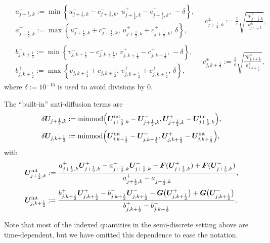 \documentclass[preprint,12pt]{elsarticle}
\newcommand{\kph}{{k+\frac{1}{2}}}
\newcommand{\jph}{{j+\frac{1}{2}}}
\newcommand{\ve}{\varepsilon}
\begin{document}
\begin{equation}
	\begin{aligned}
		\begin{aligned}
			&a^-_{\jph,k}:=\min\left\{u^-_{\jph,k}-c^-_{\jph,k},\,u^+_{\jph,k}-c^+_{\jph,k},\,-\delta\right\},\\
			&a^+_{\jph,k}:=\max\left\{u^-_{\jph,k}+c^-_{\jph,k},\,u^+_{\jph,k}+c^+_{\jph,k},\,\delta\right\},
		\end{aligned}\quad c^\pm_{\jph,k}:=\frac{1}{\ve}\sqrt{\frac{\gamma p^\pm_{\jph,k}}{\rho^\pm_{\jph,k}}},\\[1.5ex]
		\begin{aligned}
			&b^-_{j,\kph}:=\min\left\{v^-_{j,\kph}-c^-_{j,\kph},\,v^+_{j,\kph}-c^+_{j,\kph},\,-\delta\right\},\\
			&b^+_{j,\kph}:=\max\left\{v^-_{j,\kph}+c^-_{j,\kph},\,v^+_{j,\kph}+c^+_{j,\kph},\,\delta\right\},
		\end{aligned}\quad c^\pm_{j,\kph}:=\frac{1}{\ve}\sqrt{\frac{\gamma p^\pm_{j,\kph}}{\rho^\pm_{j,\kph}}},
	\end{aligned}
	\label{3.42}
\end{equation}
where $\delta:=10^{-15}$ is used to avoid divisions by $0$.

The ``built-in'' anti-diffusion terms are
\begin{equation}
	\begin{aligned}
		&\delta\bm U_{\jph,k}:={\rm minmod}\Big(\bm U_{\jph,k}^{\rm int}-\bm U^-_{\jph,k},\bm U^+_{\jph,k}-\bm U_{\jph,k}^{\rm int}\Big),\\[0.5ex]
		&\delta\bm U_{j,\kph}:={\rm minmod}\Big(\bm U_{j,\kph}^{\rm int}-\bm U^-_{j,\kph},\bm U^+_{j,\kph}-\bm U_{j,\kph}^{\rm int}\Big),
	\end{aligned}
	\label{3.43}
\end{equation}
with 
\begin{equation}
	\begin{aligned}
		&\bm U_{\jph,k}^{\rm int}:=\frac{a^+_{\jph,k}\bm U^+_{\jph,k}-a^-_{\jph,k}\bm U^-_{\jph,k}
			-\bm F(\bm U^+_{\jph,k})+\bm F(\bm U^-_{\jph,k})}{a^+_{\jph,k}-a^-_{\jph,k}},\\[0.5ex]
		&\bm U_{j,\kph}^{\rm int}:=\frac{b^+_{j,\kph}\bm U^+_{j,\kph}-b^-_{j,\kph}\bm U^-_{j,\kph}
			-\bm G\big(\bm U^+_{j,\kph}\big)+\bm G\big(\bm U^-_{j,\kph}\big)}{b^+_{j,\kph}-b^-_{j,\kph}}.
	\end{aligned}
	\label{3.44}
\end{equation}

Note that most of the indexed quantities in the semi-discrete setting above are time-dependent, but we have omitted this dependence to ease
the notation.
\end{document}
